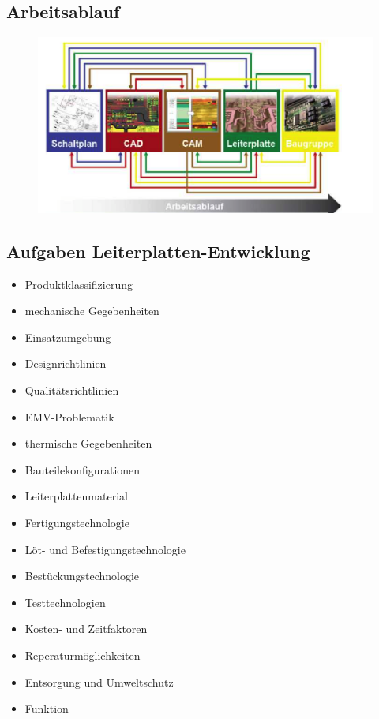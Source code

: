 \subsection{Arbeitsablauf}
\begin{figure}[!htb]
\includegraphics[scale=0.4]{pictures/arbeitsablauf}
\end{figure}

\subsection{Aufgaben Leiterplatten-Entwicklung}
\begin{itemize}
  \item Produktklassifizierung
  \item mechanische Gegebenheiten
  \item Einsatzumgebung
  \item Designrichtlinien
  \item Qualitätsrichtlinien
  \item EMV-Problematik
  \item thermische Gegebenheiten
  \item Bauteilekonfigurationen
  \item Leiterplattenmaterial
  \item Fertigungstechnologie
  \item Löt- und
Befestigungstechnologie
\item Bestückungstechnologie
\item Testtechnologien
\item Kosten- und Zeitfaktoren
\item Reperaturmöglichkeiten
\item Entsorgung und Umweltschutz
\item Funktion
\end{itemize}

